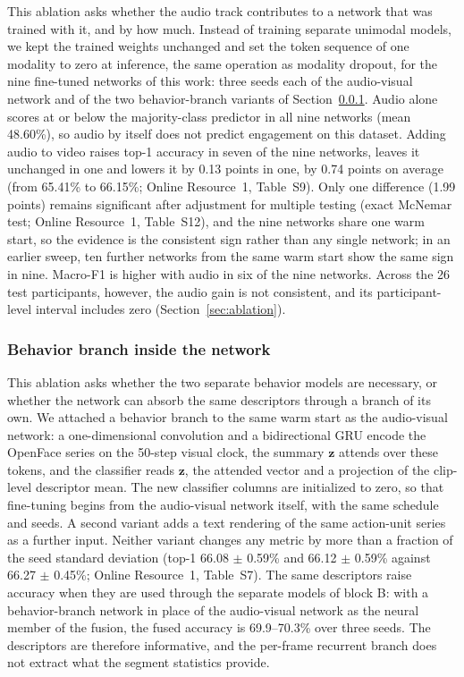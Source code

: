 \documentclass[pdflatex,iicol,sn-basic]{sn-jnl}
\begin{document}
This ablation asks whether the audio track contributes to a network that was trained with it, and by how much. Instead of training separate unimodal models, we kept the trained weights unchanged and set the token sequence of one modality to zero at inference, the same operation as modality dropout, for the nine fine-tuned networks of this work: three seeds each of the audio-visual network and of the two behavior-branch variants of Section~\ref{sec:abl_branch}. Audio alone scores at or below the majority-class predictor in all nine networks (mean 48.60\%), so audio by itself does not predict engagement on this dataset. Adding audio to video raises top-1 accuracy in seven of the nine networks, leaves it unchanged in one and lowers it by 0.13 points in one, by 0.74 points on average (from 65.41\% to 66.15\%; Online Resource~1, Table~S9). Only one difference (1.99 points) remains significant after adjustment for multiple testing (exact McNemar test; Online Resource~1, Table~S12), and the nine networks share one warm start, so the evidence is the consistent sign rather than any single network; in an earlier sweep, ten further networks from the same warm start show the same sign in nine. Macro-F1 is higher with audio in six of the nine networks. Across the 26 test participants, however, the audio gain is not consistent, and its participant-level interval includes zero (Section~\ref{sec:ablation}).


\subsubsection{Behavior branch inside the network}\label{sec:abl_branch}

This ablation asks whether the two separate behavior models are necessary, or whether the network can absorb the same descriptors through a branch of its own. We attached a behavior branch to the same warm start as the audio-visual network: a one-dimensional convolution and a bidirectional GRU encode the OpenFace series on the 50-step visual clock, the summary $\mathbf{z}$ attends over these tokens, and the classifier reads $\mathbf{z}$, the attended vector and a projection of the clip-level descriptor mean. The new classifier columns are initialized to zero, so that fine-tuning begins from the audio-visual network itself, with the same schedule and seeds. A second variant adds a text rendering of the same action-unit series as a further input. Neither variant changes any metric by more than a fraction of the seed standard deviation (top-1 66.08 $\pm$ 0.59\% and 66.12 $\pm$ 0.59\% against 66.27 $\pm$ 0.45\%; Online Resource~1, Table~S7). The same descriptors raise accuracy when they are used through the separate models of block B: with a behavior-branch network in place of the audio-visual network as the neural member of the fusion, the fused accuracy is 69.9--70.3\% over three seeds. The descriptors are therefore informative, and the per-frame recurrent branch does not extract what the segment statistics provide.
\end{document}

